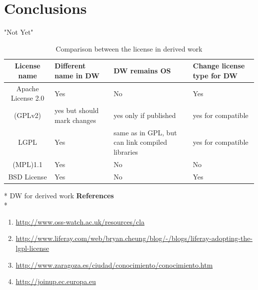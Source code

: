 \documentclass[11pt]{article} %
\begin{document}
\section{Conclusions}
"Not Yet" \\

\begin{table}[ht]
\caption{Comparison between the license in derived work}
\centering
\begin{tabular}{c  m{3cm}  m{4cm} m{3cm}}
\hline\hline

License name & Different name in  DW & DW remains OS & Change license type for DW \\ [3ex]

\hline
Apache License 2.0&Yes&No&Yes \\
(GPLv2)& yes but should mark changes & yes only if published& yes for compatible \\
LGPL&Yes& same as in GPL, but can link compiled libraries & yes for compatible \\
(MPL)1.1 & Yes & No & No \\
BSD License & Yes & No & Yes \\ [1ex]
\hline\hline
\end{tabular}
\label{table:nonlin}
\end{table}


\newpage

\centerline \small {* DW for derived work}
\newpage 
{\bf References}\\*
	\begin {enumerate}
	\item \url {http://www.oss-watch.ac.uk/resources/cla}
	\item \url {http://www.liferay.com/web/bryan.cheung/blog/-/blogs/liferay-adopting-the-lgpl-license}
	\item \url {http://www.zaragoza.es/ciudad/conocimiento/conocimiento.htm}
	\item\url {http://joinup.ec.europa.eu}
	\end {enumerate}
\newpage
\end{document}
